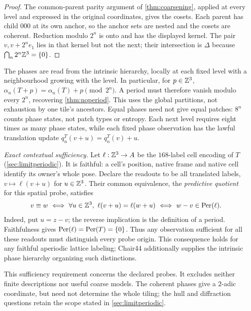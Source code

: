 \begin{proof}
The common-parent parity argument of \cref{thm:coarsening}, applied at every
level and expressed in the original coordinates, gives the cosets. Each parent
has child $000$ at its own anchor, so the anchor sets are nested and the cosets
are coherent. Reduction modulo $2^n$ is onto and has the displayed kernel.
The pair $v,v+2^ne_1$ lies in that kernel but not the next; their intersection
is $\Delta$ because $\bigcap_n2^n\mathbb{Z}^3=\{0\}$.
\end{proof}

The phases are read from the intrinsic hierarchy, locally at each fixed level
with a neighbourhood growing with the level. In particular, for $p\in\mathbb{Z}^3$,
$\alpha_n(T+p)=\alpha_n(T)+p\pmod{2^n}$. A period must therefore vanish modulo
every $2^n$, recovering \cref{thm:noperiod}. This uses the global partitions,
not exhaustion by one tile's ancestors. Equal phases need not give equal patches:
$8^n$ counts phase states, not patch types or entropy. Each next level requires
eight times as many phase states, while each fixed phase observation has the
lawful translation update $q_n^T(v+u)=q_n^T(v)+u$.

\emph{Exact contextual sufficiency.}
Let $\ell:\mathbb{Z}^3\to A$ be the $168$-label cell encoding of $T$
(\cref{sec:limitperiodic}). It is faithful: a cell's position, native frame
and native cell identify its owner's whole pose. Declare the readouts to be
all translated labels, $v\mapsto\ell(v+u)$ for $u\in\mathbb{Z}^3$. Their common
equivalence, the \emph{predictive quotient} for this spatial probe, satisfies
\[
 v\equiv w\ \Longleftrightarrow\
 \forall u\in\mathbb{Z}^3,\ \ell(v+u)=\ell(w+u)
 \ \Longleftrightarrow\ w-v\in\operatorname{Per}(\ell).
\]
Indeed, put $u=z-v$; the reverse implication is the definition of a period.
Faithfulness gives $\operatorname{Per}(\ell)=\operatorname{Per}(T)=\{0\}$. Thus any observation sufficient
for all these readouts must distinguish every probe origin. This consequence
holds for any faithful aperiodic lattice labeling; Chair44 additionally supplies
the intrinsic phase hierarchy organizing such distinctions.

This sufficiency requirement concerns the declared probes. It excludes neither
finite descriptions nor useful coarse models. The coherent phases give a $2$-adic
coordinate, but need not determine the whole tiling; the hull and diffraction
questions retain the scope stated in \cref{sec:limitperiodic}.

